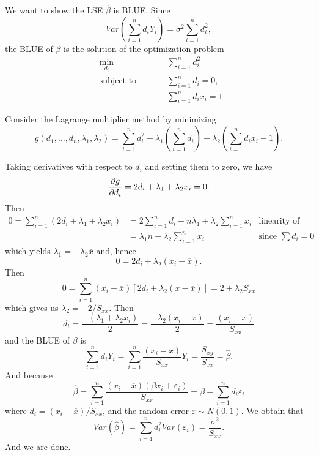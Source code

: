 \begin{example}[(cont.)]
We want to show the LSE $\widehat{\beta}$ is BLUE. Since 
\[
    Var \left( \sum^n_{i=1} d_i Y_i \right) = \sigma^2 \sum^n_{i=1} d^2_i,
\]
the BLUE of $\beta$ is the solution of the optimization problem
\begin{subequations}
\begin{alignat}{2}
&\!\min_{d_i}        &\qquad& \sum_{i=1}^{n} d^2_i\\
&\text{subject to} &      & \sum^n_{i = 1} d_i = 0,\\
&                  &      & \sum^n_{i = 1} d_i x_i = 1.
\end{alignat}
\end{subequations}

Consider the Lagrange multiplier method by minimizing 
\begin{equation}
    g(d_1, \ldots, d_n, \lambda_1, \lambda_2) = \sum_{i=1}^{n} d^2_i + \lambda_1 \left( \sum^n_{i = 1} d_i \right) + \lambda_2 \left( \sum^n_{i = 1} d_i x_i - 1 \right).
\end{equation}

Taking derivatives with respect to $d_i$ and setting them to zero, we have
\[
    \pdv{g}{d_i} = 2d_i + \lambda_1 + \lambda_2 x_i = 0.
\]
Then
\begin{align*}
    0 = \sum_{i=1}^{n} (2d_i + \lambda_1 + \lambda_2 x_i) &= 2 \sum_{i=1}^{n} d_i + n\lambda_1 + \lambda_2 \sum_{i=1}^{n} x_i & \text{linearity of summation}\\
    &= \lambda_1 n + \lambda_2 \sum^n_{i=1} x_i & \text{since } \sum d_i = 0
\end{align*}
which yields $\lambda_1 = - \lambda_2 \overline{x}$ and, hence
\[
    0 = 2d_i + \lambda_2 (x_i - \overline{x}).
\]
Then 
\[
    0 = \sum^n_{i=1} (x_i - \overline{x}) [2d_i + \lambda_2 (x - \overline{x})] = 2 + \lambda_2 S_{xx}
\]
which gives us $\lambda_2 = -2 / S_{xx}$. Then 
\[
    d_i = \frac{-(\lambda_1 + \lambda_2 x_i)}{2} = \frac{-\lambda_2(x_i - \overline{x})}{2}
    = \frac{(x_i - \overline{x})}{S_{xx}}
\]
and the BLUE of $\beta$ is 
\[
    \sum^n_{i=1} d_i Y_i = \sum_{i=1}^{n} \frac{(x_i - \overline{x})}{S_{xx}} Y_i = \frac{S_{xy}}{S_{xx}} = \widehat{\beta}.
\]
And because
\[
    \widehat{\beta} = \sum_{i=1}^{n} \frac{(x_i - \overline{x})(\beta x_i + \varepsilon_i)}{S_{xx}}
    = \beta + \sum^n_{i=1} d_i \varepsilon_i
\]
where $d_i = (x_i - \overline{x})/S_{xx}$, and the random error $\varepsilon \sim N(0,1)$. We obtain that 
\[
    Var(\widehat{\beta}) = \sum_{i=1}^{n} d^2_i Var(\varepsilon_i) = \frac{\sigma^2}{S_{xx}}.
\]
And we are done.
\end{example}

